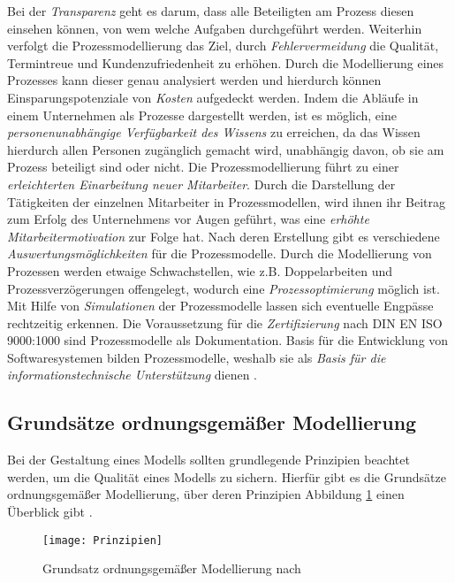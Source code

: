 Bei der \textit{Transparenz} geht es darum, dass alle Beteiligten am Prozess diesen einsehen können, von wem welche Aufgaben durchgeführt werden. Weiterhin verfolgt die Prozessmodellierung das Ziel, durch \textit{Fehlervermeidung} die Qualität, Termintreue und Kundenzufriedenheit zu erhöhen. Durch die Modellierung eines Prozesses kann dieser genau analysiert werden und hierdurch können Einsparungspotenziale von \textit{Kosten} aufgedeckt werden. Indem die Abläufe in einem Unternehmen als Prozesse dargestellt werden, ist es möglich, eine \textit{personenunabhängige Verfügbarkeit des Wissens} zu erreichen, da das Wissen hierdurch allen Personen zugänglich gemacht wird, unabhängig davon, ob sie am Prozess beteiligt sind oder nicht. Die Prozessmodellierung führt zu einer \textit{erleichterten Einarbeitung neuer Mitarbeiter}. Durch die Darstellung der Tätigkeiten der einzelnen Mitarbeiter in Prozessmodellen, wird ihnen ihr Beitrag zum Erfolg des Unternehmens vor Augen geführt, was eine \textit{erhöhte Mitarbeitermotivation} zur Folge hat. Nach deren Erstellung gibt es verschiedene \textit{Auswertungsmöglichkeiten} für die Prozessmodelle. Durch die Modellierung von Prozessen werden etwaige Schwachstellen, wie z.B. Doppelarbeiten und Prozessverzögerungen offengelegt, wodurch eine \textit{Prozessoptimierung} möglich ist. Mit Hilfe von \textit{Simulationen} der Prozessmodelle lassen sich eventuelle Engpässe rechtzeitig erkennen. Die Voraussetzung für die \textit{Zertifizierung} nach DIN EN ISO 9000:1000 sind Prozessmodelle als Dokumentation. Basis für die Entwicklung von Softwaresystemen bilden Prozessmodelle, weshalb sie als \textit{Basis für die informationstechnische Unterstützung} dienen \cite{koch2011}.

\subsection{Grundsätze ordnungsgemäßer Modellierung}

Bei der Gestaltung eines Modells sollten grundlegende Prinzipien beachtet werden, um die Qualität eines Modells zu sichern. Hierfür gibt es die Grundsätze ordnungsgemäßer Modellierung, über deren Prinzipien Abbildung \ref{fig:Prinzipien} einen Überblick gibt  \cite{freund2007}.

\begin{figure}[htp]
\begin{center}
  \texttt{[image: Prinzipien]} %
  \caption{Grundsatz ordnungsgemäßer Modellierung nach \cite{journals95}}
  \label{fig:Prinzipien}
\end{center}
\end{figure}

